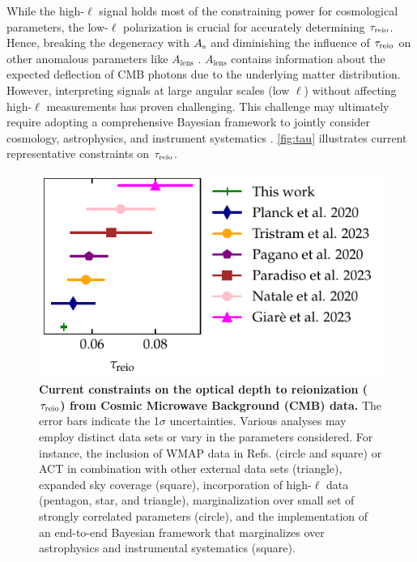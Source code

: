 While the high-$\ell$ signal holds most of the constraining power for
cosmological parameters, the low-$\ell$ polarization is crucial for
accurately determining $\tau_{\mathrm{reio}}$.
Hence, breaking the degeneracy with $A_\mathrm{s}$ and diminishing the influence
of $\tau_{\mathrm{reio}}$ on other anomalous parameters like $A_\mathrm{lens}$
\cite{Giare2023}.
$A_\mathrm{lens}$ contains information about the expected deflection of
CMB photons due to the underlying matter distribution.
However, interpreting signals at large angular scales (low $\ell$)
without affecting high-$\ell$ measurements has proven challenging.
This challenge may ultimately require adopting a comprehensive Bayesian
framework to jointly consider cosmology, astrophysics, and instrument
systematics \cite{Paradiso2023}.
\autoref{fig:tau} illustrates current representative constraints on
$\tau_{\mathrm{reio}}$.

\begin{figure}
\centering
\includegraphics{figs/tau_fig.pdf}
\caption{\textbf{Current constraints on the optical depth to
reionization ($\tau_{\mathrm{reio}}$) from Cosmic Microwave Background (CMB)
data.}
The error bars indicate the 1$\sigma$ uncertainties.
Various analyses may employ distinct data sets or vary in the parameters
considered.
For instance, the inclusion of WMAP data in Refs.
\cite{Natale2020, Paradiso2023} (circle and square) or ACT in
combination with other external data sets \cite{Giare2023} (triangle),
expanded sky coverage \cite{Paradiso2023} (square), incorporation of
high-$\ell$ data \cite{Pagano2020, Planck2020a, Giare2023} (pentagon,
star, and triangle),
marginalization over small set of strongly correlated parameters
\cite{Natale2020} (circle), and the implementation of an end-to-end
Bayesian framework that marginalizes over astrophysics and instrumental
systematics \cite{Paradiso2023} (square).}
\label{fig:tau}
\end{figure}

